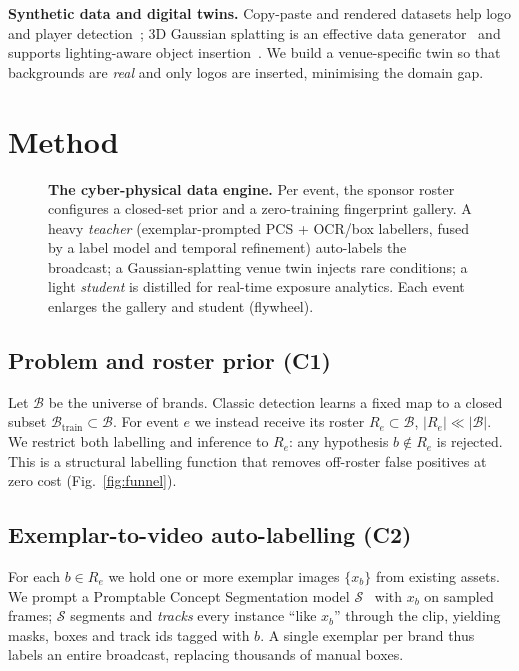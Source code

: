 \documentclass[conference]{IEEEtran}
\begin{document}
\textbf{Synthetic data and digital twins.} Copy-paste and rendered datasets help
logo and player detection~\cite{soccersynth}; 3D Gaussian splatting is an
effective data generator~\cite{gsdata} and supports lighting-aware object
insertion~\cite{d3dr}. We build a venue-specific twin so that backgrounds are
\emph{real} and only logos are inserted, minimising the domain gap.

\section{Method}
\label{sec:method}

\begin{figure}[t]
\centering

\caption{\textbf{The cyber-physical data engine.} Per event, the sponsor roster
configures a closed-set prior and a zero-training fingerprint gallery. A heavy
\emph{teacher} (exemplar-prompted PCS + OCR/box labellers, fused by a label model
and temporal refinement) auto-labels the broadcast; a Gaussian-splatting venue
twin injects rare conditions; a light \emph{student} is distilled for real-time
exposure analytics. Each event enlarges the gallery and student (flywheel).}
\label{fig:arch}
\end{figure}

\subsection{Problem and roster prior (C1)}
Let $\mathcal{B}$ be the universe of brands. Classic detection learns a fixed map
to a closed subset $\mathcal{B}_{\text{train}}\subset\mathcal{B}$. For event $e$
we instead receive its roster $R_e\subset\mathcal{B}$, $|R_e|\!\ll\!|\mathcal{B}|$.
We restrict both labelling and inference to $R_e$: any hypothesis $b\notin R_e$ is
rejected. This is a structural labelling function that removes off-roster false
positives at zero cost (Fig.~\ref{fig:funnel}).

\subsection{Exemplar-to-video auto-labelling (C2)}
For each $b\in R_e$ we hold one or more exemplar images $\{x_b\}$ from existing
assets. We prompt a Promptable Concept Segmentation model
$\mathcal{S}$~\cite{sam3} with $x_b$ on sampled frames; $\mathcal{S}$ segments and
\emph{tracks} every instance ``like $x_b$'' through the clip, yielding masks,
boxes and track ids tagged with $b$. A single exemplar per brand thus labels an
entire broadcast, replacing thousands of manual boxes.
\end{document}
